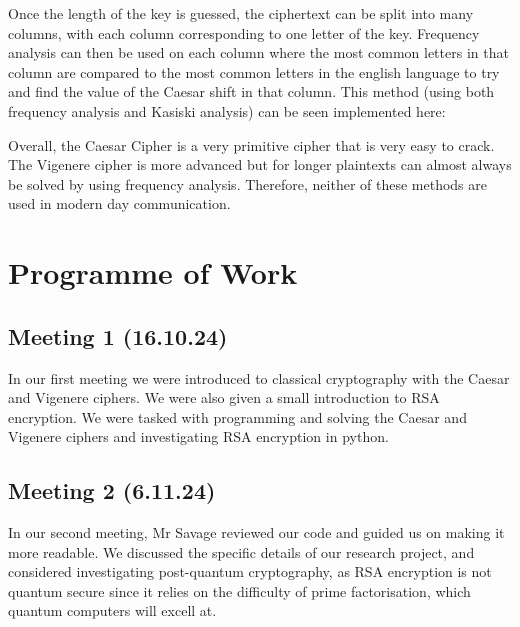 \documentclass{article}
\begin{document}
Once the length of the key is guessed, the ciphertext can be split into many columns, with each column corresponding to one letter of the key. Frequency analysis can then  be used on each column where the most common letters in that column are compared to the most common letters in the english language to try and find the value of the Caesar shift in that column. This method (using both frequency analysis and Kasiski analysis) can be seen implemented here:\medskip

Overall, the Caesar Cipher is a very primitive cipher that is very easy to crack. The Vigenere cipher is more advanced but for longer plaintexts can almost always be solved by using frequency analysis. Therefore, neither of these methods are used in modern day communication.

\section{Programme of Work}
\subsection{Meeting 1 (16.10.24)}
In our first meeting we were introduced to classical cryptography with the Caesar and Vigenere ciphers. We were also given a small introduction to RSA encryption. We were tasked with programming and solving the Caesar and Vigenere ciphers and investigating RSA encryption in python.

\subsection{Meeting 2 (6.11.24)}
In our second meeting, Mr Savage reviewed our code and guided us on making it more readable. We discussed the specific details of our research project, and considered investigating post-quantum cryptography, as RSA encryption is not quantum secure since it relies on the difficulty of prime factorisation, which quantum computers will excell at.




\end{document}
